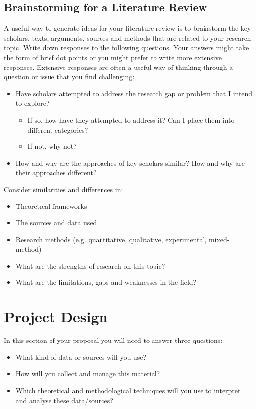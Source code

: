 \documentclass[12pt, a4paper]{article}
\begin{document}
\subsection{Brainstorming for a Literature Review}
A useful way to generate ideas for your literature review is to brainstorm the key scholars, texts, arguments, sources and methods that are related to your research topic. Write down responses to the following questions. Your answers might take the form of brief dot points or you might prefer to write more extensive responses. Extensive responses are often a useful way of thinking through a question or issue that you find challenging:
\begin{itemize}
\item Have scholars attempted to address the research gap or problem that I intend to explore?
	\begin{itemize}
		\item If so, how have they attempted to address it? Can I place them into different categories?
		\item If not, why not?
	\end{itemize}
\item How and why are the approaches of key scholars similar? How and why are their approaches different?
\end{itemize}

Consider similarities and differences in:
\begin{itemize}
\item Theoretical frameworks
\item The sources and data used
\item Research methods (e.g. quantitative, qualitative, experimental, mixed-method)
\item What are the strengths of research on this topic?
\item What are the limitations, gaps and weaknesses in the field?
\end{itemize}


\section{Project Design}
In this section of your proposal you will need to answer three questions:
\begin{itemize}
\item What kind of data or sources will you use?
\item How will you collect and manage this material?
\item Which theoretical and methodological techniques will you use to interpret and analyse these data/sources?
\end{itemize}
\end{document}
